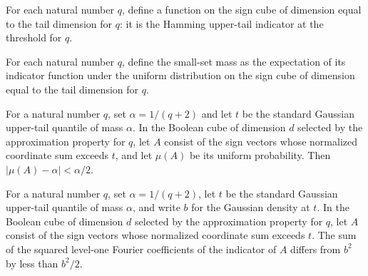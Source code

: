 \begin{definition}
\label{FABL.fknOptimalitySmallSet}
\leanok
{}
For each natural number $q$, define a function on the sign cube of dimension equal to
the tail dimension for $q$: it is the Hamming upper-tail indicator at the threshold for
$q$.
\end{definition}

\begin{definition}
\label{FABL.fknOptimalitySmallSetMass}
\leanok
{}
For each natural number $q$, define the small-set mass as the expectation of its
indicator function under the uniform distribution on the sign cube of dimension equal to
the tail dimension for $q$.
\end{definition}

\begin{theorem}
\label{FABL.fknOptimalitySmallSetMass_approx}
\leanok
{}
For a natural number $q$, set $\alpha=1/(q+2)$ and let $t$ be the standard Gaussian
upper-tail quantile of mass $\alpha$. In the Boolean cube of dimension $d$ selected by
the approximation property for $q$, let $A$ consist of the sign vectors whose normalized
coordinate sum exceeds $t$, and let $\mu(A)$ be its uniform probability. Then
$|\mu(A)-\alpha|<\alpha/2$.
\end{theorem}

\begin{theorem}
\label{FABL.fknOptimalitySmallSetWeight_approx}
\leanok
{}
For a natural number $q$, set $\alpha=1/(q+2)$, let $t$ be the standard Gaussian
upper-tail quantile of mass $\alpha$, and write $b$ for the Gaussian density at $t$. In
the Boolean cube of dimension $d$ selected by the approximation property for $q$, let
$A$ consist of the sign vectors whose normalized coordinate sum exceeds $t$. The sum of
the squared level-one Fourier coefficients of the indicator of $A$ differs from $b^2$ by
less than $b^2/2$.
\end{theorem}

